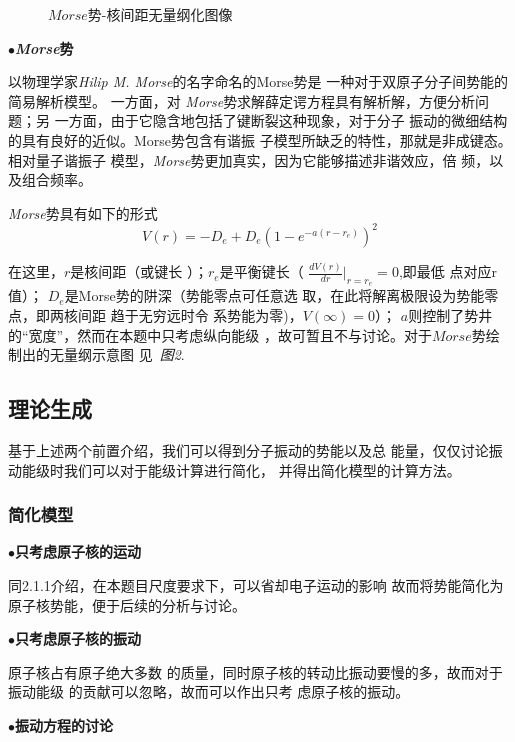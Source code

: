 \documentclass[11pt, a4paper, oneside]{ctexart}
\begin{document}
{{\begin{center}
\begin{figure}[ht]
\begin{minipage}[t]{0.5\linewidth}
            \caption{\small{ $Morse$势-核间距无量纲化图像}}
            \end{minipage}
        \end{figure}
    \end{center}    
}
\vspace{-8mm}
$\bullet${\bfseries{\emph{Morse}势}}


{
    以物理学家\emph{Hilip M. Morse}的名字命名的Morse势是
    一种对于双原子分子间势能的简易解析模型。 一方面，对
    \emph{Morse}势求解薛定谔方程具有解析解，方便分析问题；另
    一方面，由于它隐含地包括了键断裂这种现象，对于分子
    振动的微细结构的具有良好的近似。Morse势包含有谐振
    子模型所缺乏的特性，那就是非成键态。相对量子谐振子
    模型，\emph{Morse}势更加真实，因为它能够描述非谐效应，倍
    频，以及组合频率。

    \emph{Morse}势具有如下的形式
\begin{equation}
    {V(r)=-D_{e}+D_{e}(1-e^{-a(r-r_{e})})^{2}}
\end{equation}


{在这里，$r$是核间距（或键长
）；$r_e$是平衡键长（
{$\frac{dV(r)}{dr}|_{r=r_{e}}=0$},即最低
点对应r值）；
{$D_{e}$}是Morse势的阱深（势能零点可任意选
取，在此将解离极限设为势能零点，即两核间距
趋于无穷远时令
系势能为零)，{$V(\infty )=0$}）；
{$a$}则控制了势井的“宽度”，然而在本题中只考虑纵向能级
，故可暂且不与讨论。对于$Morse$势绘制出的无量纲示意图
见\ \emph{图2}.
}


\subsection{理论生成}
{基于上述两个前置介绍，我们可以得到分子振动的势能以及总
能量，仅仅讨论振动能级时我们可以对于能级计算进行简化，
并得出简化模型的计算方法。}
\subsubsection{简化模型}
{
$\bullet${\bfseries{只考虑原子核的运动}}

{\setlength{\parindent}{3em}同2.1.1介绍，在本题目尺度要求下，可以省却电子运动的影响
故而将势能简化为原子核势能，便于后续的分析与讨论。}

$\bullet${\bfseries{只考虑原子核的振动}}

{\setlength{\parindent}{3em}原子核占有原子绝大多数
的质量，同时原子核的转动比振动要慢的多，故而对于振动能级
的贡献可以忽略，故而可以作出只考
虑原子核的振动。}

$\bullet${\bfseries{振动方程的讨论}}

}}}
\end{document}
